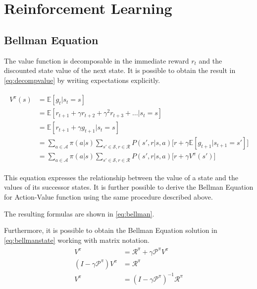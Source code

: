 \appendix

\chapter{Reinforcement Learning}

\section{Bellman Equation} \label{appendix:bellmaneq}


The value function is decomposable in the immediate reward $r_t$ and the discounted state value of the next state. It is possible to obtain the result in \vref{eq:decompvalue} by writing expectations explicitly.

\begin{align}\label{eq:decompvalue}
\begin{split}
V^\pi(s) &= \mathbb{E}[g_t | s_t = s] \\
&= \mathbb{E}[r_{t+1} + \gamma r_{t+2} + \gamma^2 r_{t+3} + \dots | s_t = s] \\
&= \mathbb{E}[r_{t+1} + \gamma g_{t+1} | s_t = s] \\
&= \sum_{a \in \mathcal{A}}\pi(a|s)\sum_{s' \in \mathcal{S}, r \in \mathcal{R}}P(s', r | s, a)\big[r + \gamma\mathbb{E}[g_{t+1}| s_{t+1} = s']\big]\\
&= \sum_{a \in \mathcal{A}}\pi(a|s)\sum_{s' \in \mathcal{S}, r \in \mathcal{R}}P(s', r | s, a)\big[r + \gamma V^\pi(s')\big]
\end{split}
\end{align}

This equation expresses the relationship between the value of a state and the values of its successor states. It is further possible to derive the Bellman Equation for Action-Value function using the same procedure described above.

The resulting formulas are shown in \vref{eq:bellman}.

Furthermore, it is possible to obtain the Bellman Equation solution in \vref{eq:bellmanstate} working with matrix notation.
\begin{align} \label{eq:bellmanstate}
\begin{split}
V^\pi &= \mathcal{R}^\pi + \gamma \mathcal{P}^\pi V^\pi \\
(I - \gamma\mathcal{P}^\pi)V^\pi &= \mathcal{R}^\pi \\
V^\pi &= (I - \gamma\mathcal{P}^\pi)^{-1}\mathcal{R}^\pi
\end{split}
\end{align}

